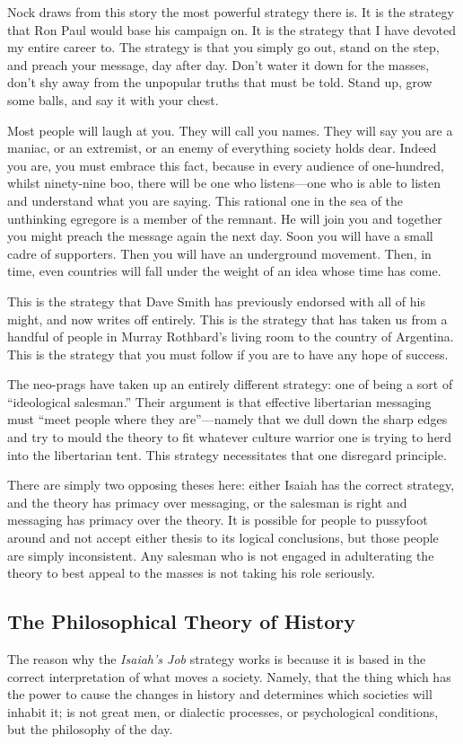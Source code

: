 \documentclass[11pt]{article}
\begin{document}
Nock draws from this story the most powerful strategy there is. It is the strategy that Ron Paul would base his campaign on. It is the strategy that I have devoted my entire career to. The strategy is that you simply go out, stand on the step, and preach your message, day after day. Don't water it down for the masses, don't shy away from the unpopular truths that must be told. Stand up, grow some balls, and say it with your chest.

Most people will laugh at you. They will call you names. They will say you are a maniac, or an extremist, or an enemy of everything society holds dear. Indeed you are, you must embrace this fact, because in every audience of one-hundred, whilst ninety-nine boo, there will be one who listens---one who is able to listen and understand what you are saying. This rational one in the sea of the unthinking egregore is a member of the remnant. He will join you and together you might preach the message again the next day. Soon you will have a small cadre of supporters. Then you will have an underground movement. Then, in time, even countries will fall under the weight of an idea whose time has come.

This is the strategy that Dave Smith has previously endorsed with all of his might, and now writes off entirely. This is the strategy that has taken us from a handful of people in Murray Rothbard's living room to the country of Argentina. This is the strategy that you must follow if you are to have any hope of success.

The neo-prags have taken up an entirely different strategy: one of being a sort of ``ideological salesman.'' Their argument is that effective libertarian messaging must ``meet people where they are''---namely that we dull down the sharp edges and try to mould the theory to fit whatever culture warrior one is trying to herd into the libertarian tent. This strategy necessitates that one disregard principle.

There are simply two opposing theses here: either Isaiah has the correct strategy, and the theory has primacy over messaging, or the salesman is right and messaging has primacy over the theory. It is possible for people to pussyfoot around and not accept either thesis to its logical conclusions, but those people are simply inconsistent. Any salesman who is not engaged in adulterating the theory to best appeal to the masses is not taking his role seriously.
\subsection{The Philosophical Theory of History}
\label{sec:org604feb3}
The reason why the \emph{Isaiah's Job} strategy works is because it is based in the correct interpretation of what moves a society. Namely, that the thing which has the power to cause the changes in history and determines which societies will inhabit it; is not great men, or dialectic processes, or psychological conditions, but the philosophy of the day.
\end{document}
